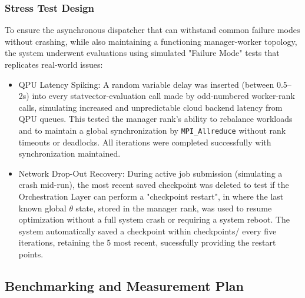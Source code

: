 \subsubsection{Stress Test Design}
To ensure the asynchronous dispatcher that can withstand common failure modes without crashing, while also maintaining a functioning manager-worker topology, 
the system underwent evaluations using simulated "Failure Mode" tests that replicates real-world issues: 
    \begin{itemize}
        \item QPU Latency Spiking: A random variable delay was inserted (between 0.5--2s) into every statvector-evaluation call made by odd-numbered worker-rank calls, simulating increased and unpredictable cloud backend latency from QPU queues. This tested the manager rank's ability to rebalance workloads and to maintain a global synchronization by \texttt{MPI\_Allreduce} without rank timeouts or deadlocks. All iterations were completed successfully with synchronization maintained. 
        \item Network Drop-Out Recovery: During active job submission (simulating a crash mid-run), the most recent saved checkpoint was deleted to test if the Orchestration Layer can perform a "checkpoint restart", in where the last known global $\theta$ state, stored in the manager rank, was used to resume optimization without a full system crash or requiring a system reboot. The system automatically saved a checkpoint within checkpoints/ every five iterations, retaining the 5 most recent, sucessfully providing the restart points. 
    \end{itemize}


\subsection{Benchmarking and Measurement Plan}
